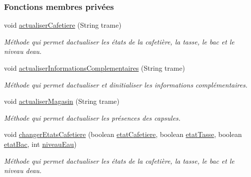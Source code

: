 \subsubsection*{Fonctions membres privées}
\begin{DoxyCompactItemize}
\item 
void \hyperlink{classcom_1_1example_1_1ekawa_1_1_cafetiere_a6485aa7504eeb5c3c09accab52bb3ad1}{actualiser\+Cafetiere} (String trame)
\begin{DoxyCompactList}\small\item\em Méthode qui permet d\textquotesingle{}actualiser les états de la cafetière, la tasse, le bac et le niveau d\textquotesingle{}eau. \end{DoxyCompactList}\item 
void \hyperlink{classcom_1_1example_1_1ekawa_1_1_cafetiere_af968afecce6625f466b145a54e8b1d44}{actualiser\+Informations\+Complementaires} (String trame)
\begin{DoxyCompactList}\small\item\em Méthode qui permet d\textquotesingle{}actualiser et d\textquotesingle{}initialiser les informations complémentaires. \end{DoxyCompactList}\item 
void \hyperlink{classcom_1_1example_1_1ekawa_1_1_cafetiere_a406c04398043ee4abca9902828197d91}{actualiser\+Magasin} (String trame)
\begin{DoxyCompactList}\small\item\em Méthode qui permet d\textquotesingle{}actualiser les présences des capsules. \end{DoxyCompactList}\item 
void \hyperlink{classcom_1_1example_1_1ekawa_1_1_cafetiere_a6fa4b1560875b71d339a9f6c24c5336d}{changer\+Etats\+Cafetiere} (boolean \hyperlink{classcom_1_1example_1_1ekawa_1_1_cafetiere_ae170dd018d1e740b3bda080d1cc3d900}{etat\+Cafetiere}, boolean \hyperlink{classcom_1_1example_1_1ekawa_1_1_cafetiere_a93c5021591facf06397e760c11556904}{etat\+Tasse}, boolean \hyperlink{classcom_1_1example_1_1ekawa_1_1_cafetiere_a058f7a18cd9c0567d583b8bc6250d143}{etat\+Bac}, int \hyperlink{classcom_1_1example_1_1ekawa_1_1_cafetiere_aaf8e1a960f803c2de4defa414b5984a4}{niveau\+Eau})
\begin{DoxyCompactList}\small\item\em Méthode qui permet d\textquotesingle{}actualiser les états de la cafetière, la tasse, le bac et le niveau d\textquotesingle{}eau. \end{DoxyCompactList}\item 

\end{DoxyCompactItemize}

